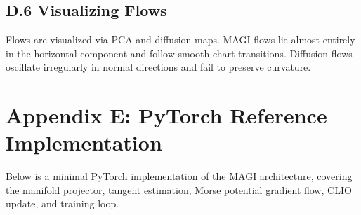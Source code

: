 \documentclass[11pt,a4paper,twocolumn]{article}
\begin{document}
\subsection*{D.6 Visualizing Flows}

Flows are visualized via PCA and diffusion maps. MAGI flows lie almost
entirely in the horizontal component and follow smooth chart
transitions. Diffusion flows oscillate irregularly in normal directions
and fail to preserve curvature.


\section*{Appendix E: PyTorch Reference Implementation}

Below is a minimal PyTorch implementation of the MAGI architecture,
covering the manifold projector, tangent estimation, Morse potential
gradient flow, CLIO update, and training loop.
\end{document}
